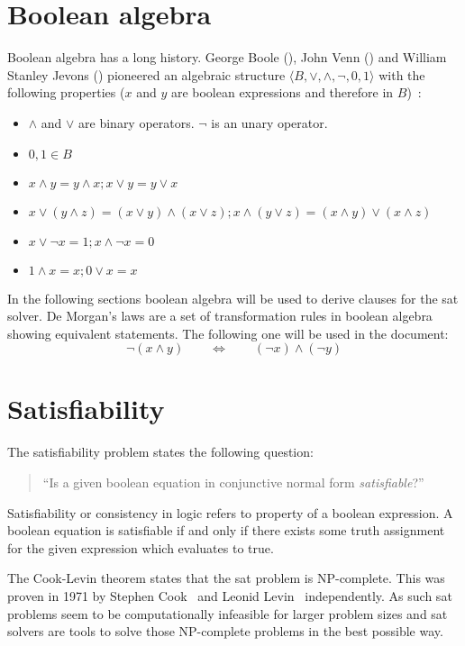 \section{Boolean algebra}
\label{sec:boole}
%
Boolean algebra has a long history. George Boole (), John Venn () and William Stanley Jevons () pioneered an algebraic structure $\langle B, \lor, \land, \neg, 0, 1\rangle$ with the following properties ($x$ and $y$ are boolean expressions and therefore in $B$)~\cite[10]{Sat20}:
%
\begin{itemize}
  \item $\land$ and $\lor$ are binary operators. $\neg$ is an unary operator.
  \item $0, 1 \in B$
  \item $x \land y = y \land x; x \lor y = y \lor x$
  \item $x \lor (y \land z) = (x \lor y) \land (x \lor z); x \land (y \lor z) = (x \land y) \lor (x \land z)$
  \item $x \lor \neg x = 1; x \land \neg x = 0$
  \item $1 \land x = x; 0 \lor x = x$
\end{itemize}

In the following sections boolean algebra will be used to derive clauses for the \gls{sat} solver. De Morgan's laws are a set of transformation rules in boolean algebra showing equivalent statements. The following one will be used in the document:
\[
  \neg (x \land y) \qquad\Leftrightarrow\qquad (\neg x) \land (\neg y)
\]

\section{Satisfiability}
\label{sec:sat}
%
The satisfiability problem states the following question:
\begin{quote}
  ``Is a given boolean equation in conjunctive normal form \emph{satisfiable}?''
\end{quote}
%
Satisfiability or consistency in logic refers to property of a boolean expression. A boolean equation is satisfiable if and only if there exists some truth assignment for the given expression which evaluates to true.

The Cook-Levin theorem states that the \gls{sat} problem is NP-complete. This was proven in 1971 by Stephen Cook~\cite{Sat01} and Leonid Levin~\cite{Sat02} independently. As such \gls{sat} problems seem to be computationally infeasible for larger problem sizes and \gls{sat} solvers are tools to solve those NP-complete problems in the best possible way.

